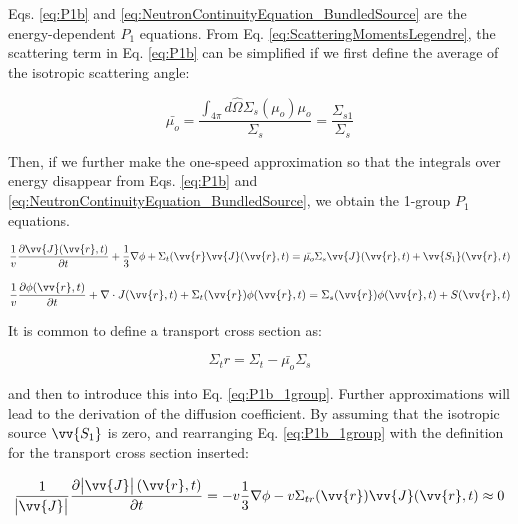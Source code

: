 \documentclass[10pt]{article}
\newcommand{\hO}{\hat{\Omega}}
\begin{document}
\begin{flushleft}
Eqs. \ref{eq:P1b} and \ref{eq:NeutronContinuityEquation_BundledSource} are the energy-dependent \(P_1\) equations. From Eq. \ref{eq:ScatteringMomentsLegendre}, the scattering term in Eq. \ref{eq:P1b} can be simplified if we first define the average of the isotropic scattering angle:

\begin{equation}
\label{eq:IsotropicScatteringAngle}
\bar{\mu_o} = \frac{\int_{4\pi}^{} d\hO  \Sigma_s(\mu_o)\mu_o}{\Sigma_s} = \frac{\Sigma_{s1}}{\Sigma_s}
\end{equation}

Then, if we further make the one-speed approximation so that the integrals over energy disappear from Eqs. \ref{eq:P1b} and \ref{eq:NeutronContinuityEquation_BundledSource}, we obtain the 1-group \(P_1\) equations. 

\begin{equation}
\label{eq:P1b_1group}
\frac{1}{v} \frac{\partial\vv{J}(\vv{r}, t)}{\partial t} +
 \frac{1}{3}\nabla\phi + \Sigma_t(\vv{r}\vv{J}(\vv{r},t) = \bar{\mu_o}\Sigma_s\vv{J}(\vv{r}, t) + \vv{S_1}(\vv{r}, t)
\end{equation}

\begin{equation}
\label{eq:NeutronContinuityEquation_BundledSource_1group}
\frac{1}{v} \frac{\partial\phi(\vv{r}, t)}{\partial t} +
 \nabla\cdot J(\vv{r}, t) + 
 \Sigma_t(\vv{r})\phi(\vv{r}, t) = \Sigma_s(\vv{r})\phi(\vv{r}, t) + S(\vv{r}, t)
\end{equation}

It is common to define a transport cross section as:

\begin{equation}
\label{eq:TransportCrossSection}
\Sigma_tr=\Sigma_t-\bar{\mu_o}\Sigma_s
\end{equation}

and then to introduce this into Eq. \ref{eq:P1b_1group}. Further approximations will lead to the derivation of the diffusion coefficient. By assuming that the isotropic source \(\vv{S_1}\) is zero, and rearranging Eq. \ref{eq:P1b_1group} with the definition for the transport cross section inserted:

\begin{equation}
\label{eq:P1b_CurrentApproximation}
\frac{1}{\abs{{\vv{J}}}} \frac{\partial\abs{{\vv{J}}}(\vv{r}, t)}{\partial t} = - v\frac{1}{3}\nabla\phi - v\Sigma_{tr}(\vv{r})\vv{J}(\vv{r},t) \approx 0
\end{equation}


\end{flushleft}
\end{document}
